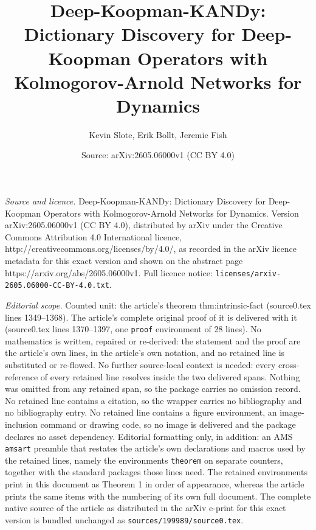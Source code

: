 \documentclass[10pt,a4paper]{amsart}
\title{Deep-Koopman-KANDy: Dictionary Discovery for Deep-Koopman Operators with Kolmogorov-Arnold Networks for Dynamics}
\author{Kevin Slote, Erik Bollt, Jeremie Fish}
\date{Source: arXiv:2605.06000v1 (CC BY 4.0)}
\begin{document}
\maketitle

\noindent\emph{Source and licence.} Deep-Koopman-KANDy: Dictionary Discovery for Deep-Koopman Operators with Kolmogorov-Arnold Networks for Dynamics. Version arXiv:2605.06000v1 (CC BY 4.0), distributed by arXiv under the Creative Commons Attribution 4.0 International licence, http://creativecommons.org/licenses/by/4.0/, as recorded in the arXiv licence metadata for this exact version and shown on the abstract page https://arxiv.org/abs/2605.06000v1. Full licence notice: \texttt{licenses/arxiv-2605.06000-CC-BY-4.0.txt}.\par\smallskip

\noindent\textit{Editorial scope.} Counted unit: the article's theorem thm:intrinsic-fact (source0.tex lines 1349--1368). The article's complete original proof of it is delivered with it (source0.tex lines 1370--1397, one \texttt{proof} environment of 28 lines). No mathematics is written, repaired or re-derived: the statement and the proof are the article's own lines, in the article's own notation, and no retained line is substituted or re-flowed.  No further source-local context is needed: every cross-reference of every retained line resolves inside the two delivered spans.  Nothing was omitted from any retained span, so the package carries no omission record.  No retained line contains a citation, so the wrapper carries no bibliography and no bibliography entry.  No retained line contains a figure environment, an image-inclusion command or drawing code, so no image is delivered and the package declares no asset dependency.  Editorial formatting only, in addition: an AMS \texttt{amsart} preamble that restates the article's own declarations and macros used by the retained lines, namely the environments \texttt{theorem} on separate counters, together with the standard packages those lines need.  The retained environments print in this document as Theorem 1 in order of appearance, whereas the article prints the same items with the numbering of its own full document.  The complete native source of the article as distributed in the arXiv e-print for this exact version is bundled unchanged as \texttt{sources/199989/source0.tex}.
\end{document}
